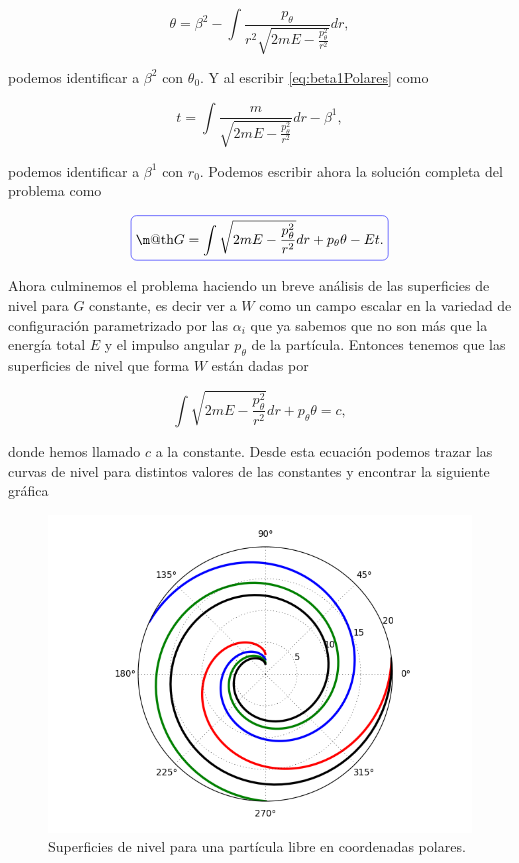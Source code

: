 \documentclass[a4paper,10pt]{article}
\makeatletter
\numberwithin{equation}{section}
\newcommand*{\boxcolor}{blue}
\renewcommand{\boxed}[1]{\textcolor{\boxcolor}{%
\tikz[baseline={([yshift=-1ex]current bounding box.center)}] \node [rectangle, minimum width=1ex,rounded corners,draw] {\normalcolor\m@th$\displaystyle#1$};}}
\makeatother
\begin{document}
\begin{equation}
 \theta =   \beta^2  - \int \frac{p_\theta}{r^2\sqrt{2mE - \frac{p_\theta^2}{r^2}}}dr,
\end{equation}

podemos identificar a $\beta^2$ con $\theta_0$. Y al escribir \eqref{eq:beta1Polares} 
como 

\begin{equation}
 t = \int \frac{m}{\sqrt{2mE - \frac{p_\theta^2}{r^2}}}dr - \beta^1,
\end{equation}

podemos identificar a $\beta^1$ con $r_0$. Podemos escribir ahora la solución 
completa del problema como

\begin{equation}
 \boxed{G = \int \sqrt{2mE - \frac{p_\theta^2}{r^2}} dr + p_\theta\theta - Et.}
\end{equation}

Ahora culminemos el problema haciendo un breve análisis de las superficies de nivel 
para $G$ constante, es decir ver a $W$ como un campo escalar en la variedad de 
configuración parametrizado por las $\alpha_i$ que ya sabemos que no son más que 
la energía total $E$ y el impulso angular $p_\theta$ de la partícula. Entonces tenemos 
que las superficies de nivel que forma $W$ están dadas por 

\begin{equation}
 \int \sqrt{2mE - \frac{p_\theta^2}{r^2}} dr + p_\theta\theta = c,
\end{equation}

donde hemos llamado $c$ a la constante. Desde esta ecuación podemos trazar las curvas 
de nivel para distintos valores de las constantes y encontrar la siguiente gráfica 

\begin{figure}[H]
 \center 
 \includegraphics[scale=0.4]{problema4fig1}
 \caption{Superficies de nivel para una partícula libre en coordenadas polares.}
 \label{fig:problema4fig1}
\end{figure}
\end{document}
